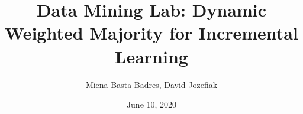 \documentclass[t]{beamer}
\title{Data Mining Lab: Dynamic Weighted Majority for Incremental Learning}
\date{June 10, 2020}
\author{Miena Basta Badres, David Jozefiak}
\begin{document}



\begin{frame}
\titlepage
\end{frame}





\end{document}
